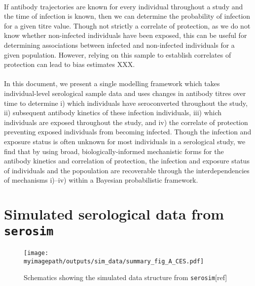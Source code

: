 \documentclass{article}
\newcommand{\myimagepath}{/Users/davidhodgson/Dropbox/Mac (3)/Documents/research/Rpackages/rjmc/}
\begin{document}
\paragraph{}If antibody trajectories are known for every individual throughout a study and the time of infection is known, then we can determine the probability of infection for a given titre value. Though not strictly a correlate of protection, as we do not know whether non-infected individuals have been exposed, this can be useful for determining associations between infected and non-infected individuals for a given population. However, relying on this sample to establish correlates of protection can lead to bias estimates XXX. 

\paragraph{}In this document, we present a single modelling framework which takes individual-level serological sample data and uses changes in antibody titres over time to determine i) which individuals have seroconverted throughout the study, ii) subsequent antibody kinetics of these infection individuals, iii) which individuals are exposed throughout the study, and iv) the correlate of protection preventing exposed individuals from becoming infected. Though the infection and exposure status is often unknown for most individuals in a serological study, we find that by using broad, biologically-informed mechanistic forms for the antibody kinetics and correlation of protection, the infection and exposure status of individuals and the popoulation are recoverable through the interdependencies of mechanisms i)–iv) within a Bayesian probabilistic framework. 




\newpage
\section{Simulated serological data from \texttt{serosim}}

\begin{figure}[h]
    \centering
    \texttt{[image: \\myimagepath/outputs/sim\_data/summary\_fig\_A\_CES.pdf]}     \caption{Schematics showing the simulated data structure from \texttt{serosim}[ref]}
    \label{fig:sim_A}
\end{figure}
\end{document}
